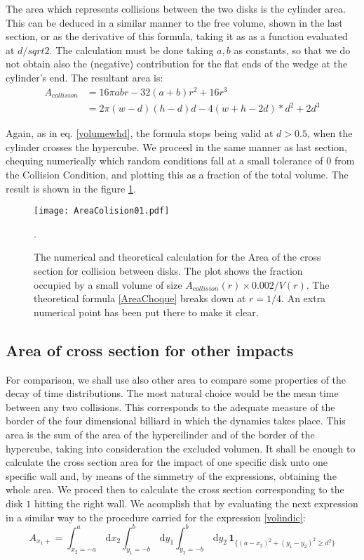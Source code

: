 \documentclass[a4paper,10pt, jcp, aps, preprint]{revtex4-1}
\newcommand{\rd}{\, \mathrm{d}}
\newcommand{\indicator}[1]{\mathbf{1}_{ \{   #1 \} } }
\begin{document}
The area which represents collisions between the two disks is the cylinder area. 
This can be deduced in a similar manner to the free volume, shown in the last
section, or as the derivative of this formula, taking it as as a function evaluated at 
$d/sqrt{2}$. The calculation must be done taking $a,b$ as constants, so that
we do not obtain also the (negative) contribution for the flat ends of
the wedge at the cylinder's end. The resultant area is:
\begin{align}\label{AreaChoque}
A_{collision} & =  16\pi a b r -32 (a+b)r^2 +16 r^3 \\
& =  2 \pi (w-d)(h-d)d  -4 (w+h-2d)*d^2 +2 d^3
\end{align}

Again, as in eq. \ref{volumewhd}, the formula stops being valid
at $d>0.5$, when the cylinder crosses the hypercube.  
We proceed in the same manner as last section, chequing numerically which
random
conditions fall at a small tolerance of $0$ from the Collision Condition, and
plotting this as a fraction of the total volume. The result is shown in the
figure \ref{AreaChoqueTeoyNum}. 

\begin{figure}
\centering
\texttt{[image: AreaColision01.pdf]}
\caption{The numerical and theoretical calculation for the Area of the cross section
for collision between disks. The plot shows the fraction occupied by a small volume
of size $A_{collision}(r)\times 0.002/V(r)$. The theoretical formula 
\ref{AreaChoque} breaks down at
$r=1/4$. An extra numerical point has been put there to make it clear.}
\label{AreaChoqueTeoyNum}.
\end{figure}



\subsection{Area of cross section for other impacts}

For comparison, we shall use also other area to compare
some properties of the decay of time distributions. The most natural choice
would be the mean time between any two collisions. This corresponds
to the adequate measure of the border of the four dimensional
billiard in which the dynamics takes place. This area is
the sum of the area of the hypercilinder and of the border of the
hypercube, taking into consideration the excluded volumen. 
It shall be enough to calculate the cross section area for
the impact of one specific disk unto one specific wall and,
by means of the simmetry of the expressions, obtaining the whole
area. We proced then to calculate the cross section corresponding to 
the disk $1$ hitting the right wall. We acomplish that by
evaluating the next expression in a similar way to
the procedure carried for the expression \ref{volindic}:
\begin{equation}\label{areaindic}
 A_{x_1+} =  \int_{x_2 = -a}^a \rd x_2 
\int_{y_1 = -b}^b \rd y_1 \int_{y_2 = -b}^b \rd y_2 \, \indicator{ (a-x_2)^2 + (y_1-y_2)^2 \ge d^2 }
\end{equation}
\end{document}
